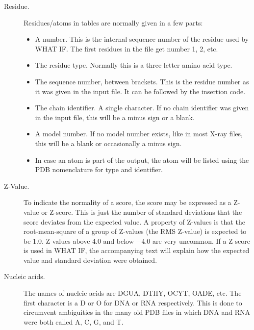 \documentclass[a4paper]{article}
\begin{document}
\begin{description}
\item[Residue.] Residues/atoms in tables are normally given in a few parts:
\begin{itemize}
\item A number. This is the internal sequence number of the residue used
    by WHAT IF. The first residues in the file get number 1, 2, etc.
\item The residue type. Normally this is a three letter amino acid type.
\item The sequence number, between brackets. This is the residue number
    as it was given in the input file. It can be followed by the insertion
    code.
\item The chain identifier. A single character. If no chain identifier
    was given in the input file, this will be a minus sign or a blank.
\item A model number. If no model number exists, like in most X-ray files,
    this will be a blank or occasionally a minus sign.
\item In case an atom is part of the output, the atom will be listed using
    the PDB nomenclature for type and identifier.
\end{itemize}
\item[Z-Value.] To indicate the normality of a score, the score
   may be expressed as a Z-value or Z-score. This is just the number
   of standard deviations that the score deviates from the expected
   value.  A property of Z-values is that the root-mean-square of a
   group of Z-values (the RMS Z-value) is expected to be 1.0. Z-values
   above 4.0 and below $-4.0$ are very uncommon. If a Z-score is used
   in WHAT IF, the accompanying text will explain how the expected
   value and standard deviation were obtained.
\item[Nucleic acids.] The names of nucleic acids are DGUA, DTHY, OCYT,
   OADE, etc. The first character is a D or O for DNA or RNA respectively.
   This is done to circumvent ambiguities in the many old PDB files in which
   DNA and RNA were both called A, C, G, and T.
\end{description}
\end{document}
